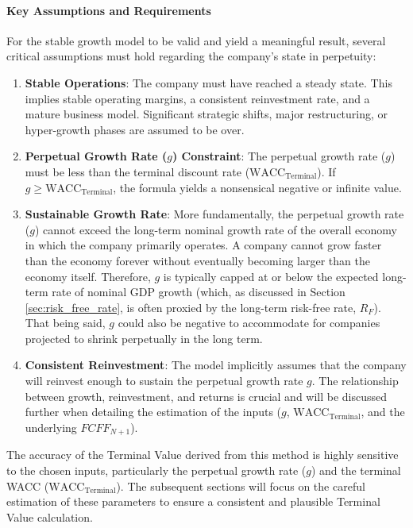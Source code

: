 \paragraph{Key Assumptions and Requirements}
For the stable growth model to be valid and yield a meaningful result, several critical assumptions must hold regarding the company's state in perpetuity:
\begin{enumerate}
    \item \textbf{Stable Operations}: The company must have reached a steady state. This implies stable operating margins, a consistent reinvestment rate, and a mature business model. Significant strategic shifts, major restructuring, or hyper-growth phases are assumed to be over.
    \item \textbf{Perpetual Growth Rate (\(g\)) Constraint}: The perpetual growth rate (\(g\)) must be less than the terminal discount rate (\(\text{WACC}_{\text{Terminal}}\)). If \(g \ge \text{WACC}_{\text{Terminal}}\), the formula yields a nonsensical negative or infinite value.
    \item \textbf{Sustainable Growth Rate}: More fundamentally, the perpetual growth rate (\(g\)) cannot exceed the long-term nominal growth rate of the overall economy in which the company primarily operates. A company cannot grow faster than the economy forever without eventually becoming larger than the economy itself. Therefore, \(g\) is typically capped at or below the expected long-term rate of nominal GDP growth (which, as discussed in Section \ref{sec:risk_free_rate}, is often proxied by the long-term risk-free rate, \(R_F\)). That being said, \(g\) could also be negative to accommodate for companies projected to shrink perpetually in the long term.
    \item \textbf{Consistent Reinvestment}: The model implicitly assumes that the company will reinvest enough to sustain the perpetual growth rate \(g\). The relationship between growth, reinvestment, and returns is crucial and will be discussed further when detailing the estimation of the inputs (\(g\), \(\text{WACC}_{\text{Terminal}}\), and the underlying \(FCFF_{N+1}\)).
\end{enumerate}

The accuracy of the Terminal Value derived from this method is highly sensitive to the chosen inputs, particularly the perpetual growth rate (\(g\)) and the terminal WACC (\(\text{WACC}_{\text{Terminal}}\)). The subsequent sections will focus on the careful estimation of these parameters to ensure a consistent and plausible Terminal Value calculation.

